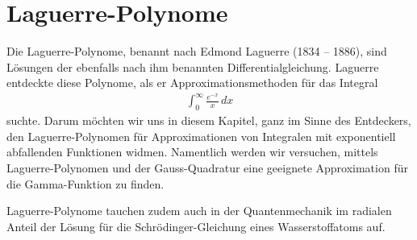 %
%
%
\chapter{Laguerre-Polynome\label{chapter:laguerre}}
\begin{refsection}

{\parindent0pt Die} Laguerre\--Polynome,
benannt nach Edmond Laguerre (1834 -- 1886),
sind Lösungen der ebenfalls nach %
ihm
benannten Differentialgleichung.
Laguerre entdeckte diese Polynome, als er Approximations\-methoden
für das Integral
\begin{align*}
\int_0^\infty \frac{e^{-x}}{x} \, dx
\end{align*}
suchte.
Darum möchten wir uns in diesem Kapitel,
ganz im Sinne des Entdeckers,
den Laguerre-Polynomen für Approximationen von Integralen mit
exponentiell abfallenden Funktionen widmen.
Namentlich werden wir versuchen, mittels Laguerre-Polynomen und
der Gauss-Quadratur eine geeignete Approximation für die Gamma-Funktion zu
finden.

Laguerre-Polynome tauchen zudem auch in der Quantenmechanik im radialen Anteil
der Lösung für die Schrödinger-Gleichung eines Wasserstoffatoms auf.





% 
% 

\printbibliography[heading=subbibliography]
\end{refsection}
